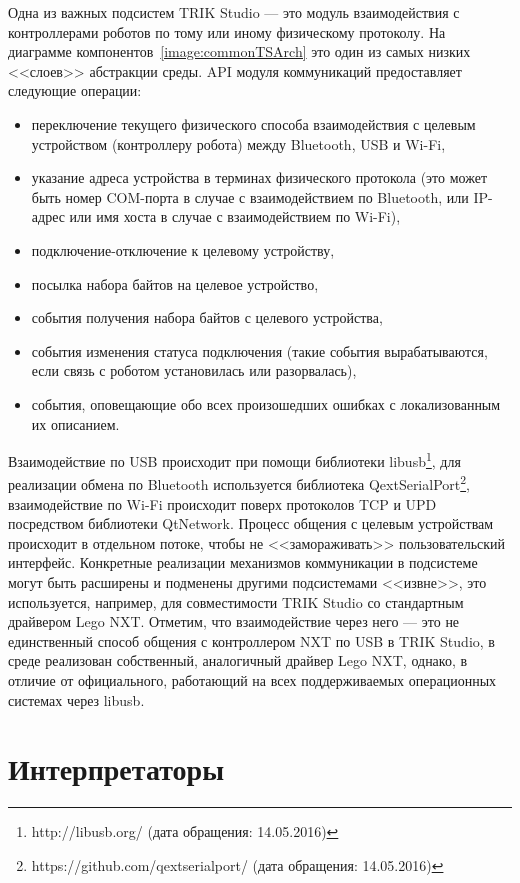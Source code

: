 \documentclass[a5paper]{article}
\begin{document}
Одна из важных подсистем TRIK Studio --- это модуль взаимодействия с контроллерами роботов по тому или иному физическому протоколу. На диаграмме компонентов~\ref{image:commonTSArch} это один из самых низких <<слоев>> абстракции среды. API модуля коммуникаций предоставляет следующие операции:

\begin{itemize}
    \item переключение текущего физического способа взаимодействия с целевым устройством (контроллеру робота) между Bluetooth, USB и Wi-Fi,
    \item указание адреса устройства в терминах физического протокола (это может быть номер COM-порта в случае с взаимодействием по Bluetooth, или IP-адрес или имя хоста в случае с взаимодействием по Wi-Fi),
    \item подключение-отключение к целевому устройству,
    \item посылка набора байтов на целевое устройство,
    \item события получения набора байтов с целевого устройства,
    \item события изменения статуса подключения (такие события вырабатываются, если связь с роботом установилась или разорвалась),
    \item события, оповещающие обо всех произошедших ошибках с локализованным их описанием.
\end{itemize}

Взаимодействие по USB происходит при помощи библиотеки libusb\footnote{http://libusb.org/ (дата обращения: 14.05.2016)}, для реализации обмена по Bluetooth используется библиотека QextSerialPort\footnote{https://github.com/qextserialport/ (дата обращения: 14.05.2016)}, взаимодействие по Wi-Fi происходит поверх протоколов TCP и UPD посредством библиотеки QtNetwork. Процесс общения с целевым устройствам происходит в отдельном потоке, чтобы не <<замораживать>> пользовательский интерфейс. Конкретные реализации механизмов коммуникации в подсистеме могут быть расширены и подменены другими подсистемами <<извне>>, это используется, например, для совместимости TRIK Studio со стандартным драйвером Lego NXT. Отметим, что взаимодействие через него --- это не единственный способ общения с контроллером NXT по USB в TRIK Studio, в среде реализован собственный, аналогичный драйвер Lego NXT, однако, в отличие от официального, работающий на всех поддерживаемых операционных системах через libusb.

\section{Интерпретаторы}
\label{chapter:interpreters}
\end{document}
